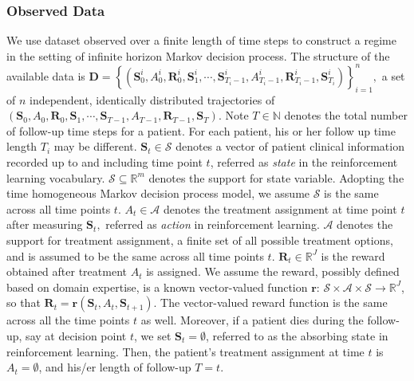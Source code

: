 \documentclass{article}
\newcommand{\bs}{ \boldsymbol}
\newcommand{\mb}{\mathbb}
\newcommand{\ml}{\mathcal}
\newcommand{\lt}{\left}
\newcommand{\rt}{\right}
\begin{document}
\subsubsection*{Observed Data}
We use dataset observed over a finite length of time steps to construct a regime in the setting of infinite horizon Markov decision process. The structure of the available data is  $\bs{D} = \lt\{  (\bs{S}^i_{0}, A^i_{0}, \bs{R}^i_{0} , \bs{S}^i_{1}, \cdots, 
\bs{S}^i_{T_i-1} , A^i_{T_i-1}, \bs{R}^i_{T_i-1}, \bs{S}^i_{T_i}) \rt\}_{i=1}^n,$
a set of $n$ independent, identically distributed trajectories of\\
$\lt(\bs{S}_{0}, A_{0}, \bs{R}_{0} , \bs{S}_{1}, \cdots, 
\bs{S}_{T-1} , A_{T-1}, \bs{R}_{T-1}, \bs{S}_{T}\rt).$
Note $T \in \mb{N}$ denotes the total number of follow-up time steps for a patient. For each patient, his or her follow up time length $T_i$ may be different. $\bs{S}_{t} \in \bs{\ml{S}}$ denotes a vector of patient clinical information recorded up to and including time point $t$, referred as \textit{state} in the reinforcement learning vocabulary. $\bs{\ml{S}} \subseteq \mb{R}^m$ denotes the support for state variable. Adopting the time homogeneous Markov decision process model, we assume $\bs{\ml{S}}$ is the same across all time points $t$.  $A_{t} \in \ml{A}$ denotes the treatment assignment at time point $t$ after measuring $\bs{S}_{t},$  referred as \textit{action} in reinforcement learning.  $\ml{A}$ denotes the support for treatment assignment, a finite set of all possible treatment options, and is assumed to be the same across all time points $t$. $\bs{R}_{t} \in \mb{R}^J$ is the reward obtained after treatment $A_{t}$ is assigned. We assume the reward, possibly defined based on domain expertise, is a known vector-valued function $\bs{r}$: $\bs{\ml{S}} \times \ml{A}  \times \bs{\ml{S}} \to \mb{R}^J $, so that $\bs{R}_{t} = \bs{r}(\bs{S}_{t}, A_t, \bs{S}_{t+1})$. The vector-valued reward function is the same across all the time points $t$ as well. Moreover, if a patient dies during the follow-up, say at decision point $t$, we set $\bs{S}_t = \bs{\emptyset}$, referred to as the absorbing state in reinforcement learning. Then, the patient's treatment assignment at time $t$ is $A_t=\emptyset$, and his/er length of follow-up $T = t$.	
\end{document}
